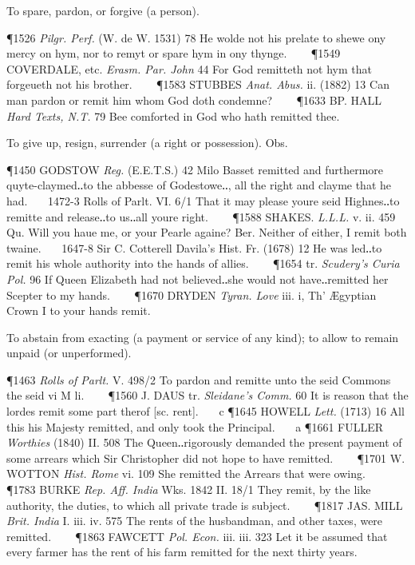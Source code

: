 \begin{description}[wide, labelwidth=!, labelindent=0pt]
\begin{myenumerate}
 To spare, pardon, or forgive (a person).

\P 1526  \textit{Pilgr. Perf.} (W. de W. 1531) 78 He wolde not his prelate to shewe ony mercy on hym, nor to remyt or spare hym in ony thynge.    
\P 1549 COVERDALE, etc. \textit{Erasm. Par. John} 44 For God remitteth not hym that forgeueth not his brother.    
\P 1583 STUBBES  \textit{Anat. Abus.} ii. (1882) 13 Can man pardon or remit him whom God doth condemne?    
\P 1633 BP. HALL  \textit{Hard Texts, N.T.} 79 Bee comforted in God who hath remitted thee.

 To give up, resign, surrender (a right or possession). Obs.

\P 1450 GODSTOW  \textit{Reg.} (E.E.T.S.) 42 Milo Basset remitted and furthermore quyte-claymed‥to the abbesse of Godestowe‥, all the right and clayme that he had.    1472-3 Rolls of Parlt. VI. 6/1 That it may please youre seid Highnes‥to remitte and release‥to us‥all youre right.    
\P 1588 SHAKES.  \textit{L.L.L.} v. ii. 459 Qu. Will you haue me, or your Pearle againe? Ber. Neither of either, I remit both twaine.    1647-8 Sir C. Cotterell Davila's Hist. Fr. (1678) 12 He was led‥to remit his whole authority into the hands of allies.    
\P 1654 tr.  \textit{Scudery's Curia Pol.} 96 If Queen Elizabeth had not believed‥she would not have‥remitted her Scepter to my hands.    
\P 1670 DRYDEN  \textit{Tyran. Love} iii. i, Th' Ægyptian Crown I to your hands remit.

 To abstain from exacting (a payment or service of any kind); to allow to remain unpaid (or unperformed).

\P 1463  \textit{Rolls of Parlt.} V. 498/2 To pardon and remitte unto the seid Commons the seid vi M li.    
\P 1560 J. DAUS tr. \textit{Sleidane's Comm.} 60 It is reason that the lordes remit some part therof [sc. rent].    c 
\P 1645 HOWELL  \textit{Lett.} (1713) 16 All this his Majesty remitted, and only took the Principal.    a 
\P 1661 FULLER  \textit{Worthies} (1840) II. 508 The Queen‥rigorously demanded the present payment of some arrears which Sir Christopher did not hope to have remitted.    
\P 1701 W. WOTTON  \textit{Hist. Rome} vi. 109 She remitted the Arrears that were owing.    
\P 1783 BURKE  \textit{Rep. Aff. India} Wks. 1842 II. 18/1  They remit, by the like authority, the duties, to which all private trade is subject.    
\P 1817 JAS. MILL  \textit{Brit. India} I. iii. iv. 575 The rents of the husbandman, and other taxes, were remitted.    
\P 1863 FAWCETT  \textit{Pol. Econ.} iii. iii. 323 Let it be assumed that every farmer has the rent of his farm remitted for the next thirty years.


\end{myenumerate}
\end{description}
